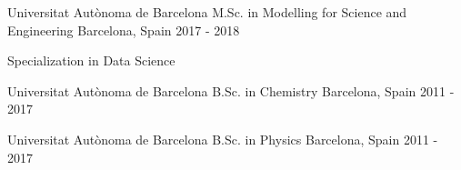 

\begin{cventries}

  \cventry
    {Universitat Autònoma de Barcelona} %
    {M.Sc. in Modelling for Science and Engineering} %
    {Barcelona, Spain} %
    {2017 - 2018} %
    {
      \begin{cvitems} %
        \item {Specialization in Data Science}
      \end{cvitems}
    }

  \cventry
    {Universitat Autònoma de Barcelona} %
    {B.Sc. in Chemistry} %
    {Barcelona, Spain} %
    {2011 - 2017} %
    {~}

  \cventry
    {Universitat Autònoma de Barcelona} %
    {B.Sc. in Physics} %
    {Barcelona, Spain} %
    {2011 - 2017} %
    {~}

\end{cventries}
